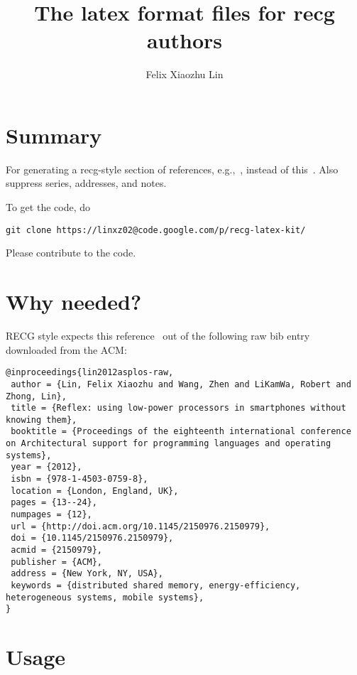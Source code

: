 \documentclass[letterpaper,11pt]{article}
\title{The latex format files for recg authors}
\author{Felix Xiaozhu Lin}
\begin{document}
\maketitle

\section{Summary}

For generating a recg-style section of references, e.g.,~\cite{lin2012asplos}, instead of this~\cite{lin2012asplos-raw}.
Also suppress series, addresses, and notes. 

To get the code, do

\begin{lstlisting}
git clone https://linxz02@code.google.com/p/recg-latex-kit/
\end{lstlisting}

Please contribute to the code.

\section{Why needed?}
RECG style expects this reference~\cite{lin2012asplos} out of the following raw bib entry downloaded from the ACM:

\begin{lstlisting}
@inproceedings{lin2012asplos-raw,
 author = {Lin, Felix Xiaozhu and Wang, Zhen and LiKamWa, Robert and Zhong, Lin},
 title = {Reflex: using low-power processors in smartphones without knowing them},
 booktitle = {Proceedings of the eighteenth international conference on Architectural support for programming languages and operating systems},
 year = {2012},
 isbn = {978-1-4503-0759-8},
 location = {London, England, UK},
 pages = {13--24},
 numpages = {12},
 url = {http://doi.acm.org/10.1145/2150976.2150979},
 doi = {10.1145/2150976.2150979},
 acmid = {2150979},
 publisher = {ACM},
 address = {New York, NY, USA},
 keywords = {distributed shared memory, energy-efficiency, heterogeneous systems, mobile systems},
} 
\end{lstlisting}

\section{Usage}
\end{document}
